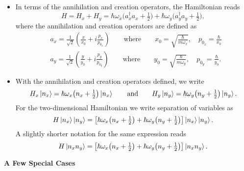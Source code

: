 \documentclass[11pt, a4paper]{article}
\newcommand{\eqtext}[1]{\qquad \text{#1} \qquad}
\begin{document}
\begin{itemize}
	\item In terms of the annihilation and creation operators, the Hamiltonian reads
	\begin{equation*}
		H = H_{x} + H_{y} = \hbar \omega_{x}\big(a_{x}^{\dagger}a_{x} + \tfrac{1}{2}\big) + \hbar \omega_{y}\big(a_{y}^{\dagger}a_{y} + \tfrac{1}{2}\big),
	\end{equation*}
	where the annihilation and creation operators are defined as
	\begin{align*}
		&a_{x} = \frac{1}{\sqrt{2}}\left(\frac{x}{x_{0}} + i \frac{p_{x}}{p_{0_{x}}}\right) \eqtext{where} x_{0} = \sqrt{\frac{\hbar}{m\omega_{x}}}, \quad p_{0_{x}} = \frac{\hbar}{x_{0}}\\
		&a_{y} = \frac{1}{\sqrt{2}}\left(\frac{y}{y_{0}} + i \frac{p_{y}}{p_{0_{y}}}\right) \eqtext{where} y_{0} = \sqrt{\frac{\hbar}{m\omega_{y}}}, \quad p_{0_{y}} = \frac{\hbar}{y_{0}}.
	\end{align*}
	
    \item With the annihilation and creation operators defined, we write
	\begin{equation*}
		H_{x} \ket{n_{x}} = \hbar \omega_{x} \big(n_{x} + \tfrac{1}{2}\big) \ket{n_{x}} \eqtext{and} H_{y} \ket{n_{y}} = \hbar \omega_{y} \big(n_{y} + \tfrac{1}{2}\big) \ket{n_{y}}.
	\end{equation*}
	For the two-dimensional Hamiltonian we write separation of variables as
	\begin{equation*}
		H\ket{n_{x}} \ket{n_{y}} = \left[\hbar \omega_{x} \big(n_{x} + \tfrac{1}{2}\big) + \hbar \omega_{y} \big(n_{y} + \tfrac{1}{2}\big)\right] \ket{n_{x}} \ket{n_{y}}.
	\end{equation*}
	A slightly shorter notation for the same expression reads
	\begin{equation*}
		H\ket{n_{x}n_{y}} = \left[\hbar \omega_{x} \big(n_{x} + \tfrac{1}{2}\big) + \hbar \omega_{y} \big(n_{y} + \tfrac{1}{2}\big)\right] \ket{n_{x}n_{y}}.
	\end{equation*}
\end{itemize}	
	\textbf{A Few Special Cases}
\end{document}
